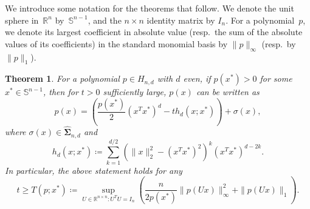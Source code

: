 \documentclass[12pt]{article}
\newcommand{\reals}{\mathbb{R}}
\newcommand{\HSOS}{\widehat{\mathbf{\Sigma}}}
\newcommand{\defeq}{\coloneq}
\newcommand{\mbS}{\mathbb{S}}
\newtheorem{theorem}{Theorem}%
\theoremstyle{remark}
\begin{document}
We introduce some notation for the theorems that follow. We denote the unit sphere in~$\reals^n$ by~$\mbS^{n-1}$, and the $n\times n$ identity matrix by $I_n$. 
For a polynomial~$p$, we denote its largest coefficient in absolute value (resp.\ the sum of the absolute values of its coefficients) in the standard monomial basis by $\|p\|_{\infty}$ (resp.\ by $\|p\|_1$).



\begin{theorem}\label{thm:degd_homo}
For a polynomial $p\in H_{n,d}$ with $d$ even, if $p(x^*)>0$ for some $x^*\in \mbS^{n-1}$, then for $t>0$ sufficiently large, $p(x)$ can be written as
\begin{equation}\label{eq:degd_homo}
    p(x)=\left(\frac{p(x^*)}{2}(x^Tx^*)^d-th_d(x;x^*)\right)+\sigma(x),
\end{equation}
where $\sigma(x)\in\HSOS_{n,d}$ and 
\begin{equation}\label{eq:degd_homo_h}
h_d(x;x^*)\defeq\sum_{k=1}^{d/2}\left(\|x\|_2^2-(x^Tx^*)^2\right)^k(x^Tx^*)^{d-2k}.
\end{equation}
%
In particular, the above statement holds for any
\begin{equation}\label{eq:degd_homo_t}
t\ge T(p;x^*)\defeq\sup_{U\in\reals^{n\times n}:U^TU=I_n}\left( \frac{n}{2p(x^*)}\|p(Ux)\|_{\infty}^2 + \|p(Ux)\|_1\right).  
\end{equation}
\end{theorem}
\end{document}
